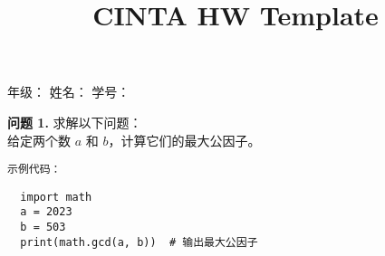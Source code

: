 \documentclass[a4paper]{CINTA}
\title{CINTA HW Template}
\begin{document}
\maketitle
\begin{center}
    年级：\underline{\hspace{1.5cm}}
    姓名：\underline{\hspace{1.5cm}}
    学号：\underline{\hspace{2.5cm}}
\end{center}

\textbf{问题 1.} 求解以下问题：\\
给定两个数 $a$ 和 $b$，计算它们的最大公因子。

\texttt{示例代码：}
\begin{verbatim}
  import math
  a = 2023
  b = 503
  print(math.gcd(a, b))  # 输出最大公因子
\end{verbatim}
\tableofcontents

\end{document}
